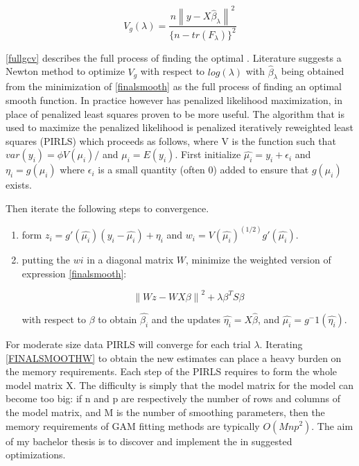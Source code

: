 \documentclass{article}
\begin{document}
    \begin{equation} \label{fullgcv} V_g(\lambda) = \frac{n\left \| y-X\widehat{\beta}_\lambda \right \| ^2}{\{n-tr(F_\lambda) \}^2} \end{equation}

    \ref{fullgcv} describes the full process of finding the optimal \textlambda.  Literature suggests a Newton method to optimize $V_g$ with respect to $log(\lambda)$ with $\widehat{\beta}_\lambda$ being obtained from the minimization of \ref{finalsmooth} as the full process of finding an optimal smooth function. In practice however has penalized likelihood maximization, in place of penalized least squares proven to be more useful. The algorithm that is used to maximize the penalized likelihood is penalized iteratively reweighted least squares (PIRLS) which proceeds as follows, where V is the function such that $var(y_i) = \phi V(\mu_i)/$ and $\mu_i = E(y_i)$. First initialize $\widehat{\mu_i} = y_i + \epsilon_i $ and $\eta_i = g(\mu_i)$ where $\epsilon_i$ is a small quantity (often 0) added to ensure that $g(\mu_i)$ exists.

    Then iterate the following steps to convergence.
    \begin{enumerate}
    \item form $z_i = g'(\widehat{\mu_i})(y_i − \widehat{\mu_i}) + \eta_i$ and $w_i = V(\widehat{\mu_i})^(1/2) g'(\widehat{\mu_i})$.
    \item putting the $wi$ in a diagonal matrix $W$, minimize the weighted version of expression \ref{finalsmooth}:

    \begin{equation} \label{FINALSMOOTHW} \left \| Wz - WX\beta  \right \|^2 + \lambda \beta^T S\beta  \end{equation}


    with respect to $\beta$ to obtain $\widehat{\beta_i}$ and the updates $\widehat{\eta_i} =X\widehat{\beta}$, and $\widehat{\mu_i} =g^-1(\widehat{\eta_i})$.
    \end{enumerate}

    For moderate size data PIRLS will converge for each trial $\lambda$. Iterating \ref{FINALSMOOTHW} to obtain the new estimates can place a heavy burden on the memory requirements. Each step of the PIRLS requires to form the whole model matrix X. The difficulty is simply that the model matrix for the model can become too big: if n and p are respectively the number of rows and columns of the model matrix, and M is the number of smoothing parameters, then the memory requirements of GAM fitting methods are typically $O(Mnp^2)$. The aim of my bachelor thesis is to discover and implement the in \cite{bigdataGAM} suggested optimizations.
\end{document}
